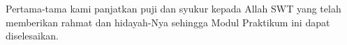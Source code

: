 \begin{acknowledgements}
Pertama-tama kami panjatkan puji dan syukur kepada Allah SWT yang telah memberikan rahmat dan hidayah-Nya sehingga Modul Praktikum ini dapat diselesaikan.
\end{acknowledgements}
